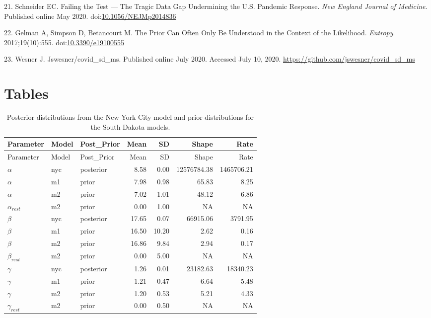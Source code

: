 \documentclass[
]{article}
\begin{document}
\leavevmode\hypertarget{ref-schneider_failing_2020}{}%
21. Schneider EC. Failing the Test --- The Tragic Data Gap Undermining the U.S. Pandemic Response. \emph{New England Journal of Medicine}. Published online May 2020. doi:\href{https://doi.org/10.1056/NEJMp2014836}{10.1056/NEJMp2014836}

\leavevmode\hypertarget{ref-gelman_prior_2017}{}%
22. Gelman A, Simpson D, Betancourt M. The Prior Can Often Only Be Understood in the Context of the Likelihood. \emph{Entropy}. 2017;19(10):555. doi:\href{https://doi.org/10.3390/e19100555}{10.3390/e19100555}

\leavevmode\hypertarget{ref-wesner_jswesnercovid_sd_ms_2020}{}%
23. Wesner J. Jswesner/covid\_sd\_ms. Published online July 2020. Accessed July 10, 2020. \url{https://github.com/jswesner/covid_sd_ms}

\newpage

\FloatBarrier

\hypertarget{tables}{%
\section{Tables}\label{tables}}

\begin{longtable}[]{@{}lllrrrr@{}}
\caption{\label{tab:unnamed-chunk-1}Posterior distributions from the New York City model and prior distributions for the South Dakota models.}\tabularnewline
\toprule
Parameter & Model & Post\_Prior & Mean & SD & Shape & Rate\tabularnewline
\midrule
\endfirsthead
\toprule
Parameter & Model & Post\_Prior & Mean & SD & Shape & Rate\tabularnewline
\midrule
\endhead
\(\alpha\) & nyc & posterior & 8.58 & 0.00 & 12576784.38 & 1465706.21\tabularnewline
\(\alpha\) & m1 & prior & 7.98 & 0.98 & 65.83 & 8.25\tabularnewline
\(\alpha\) & m2 & prior & 7.02 & 1.01 & 48.12 & 6.86\tabularnewline
\(\alpha_{rest}\) & m2 & prior & 0.00 & 1.00 & NA & NA\tabularnewline
\(\beta\) & nyc & posterior & 17.65 & 0.07 & 66915.06 & 3791.95\tabularnewline
\(\beta\) & m1 & prior & 16.50 & 10.20 & 2.62 & 0.16\tabularnewline
\(\beta\) & m2 & prior & 16.86 & 9.84 & 2.94 & 0.17\tabularnewline
\(\beta_{rest}\) & m2 & prior & 0.00 & 5.00 & NA & NA\tabularnewline
\(\gamma\) & nyc & posterior & 1.26 & 0.01 & 23182.63 & 18340.23\tabularnewline
\(\gamma\) & m1 & prior & 1.21 & 0.47 & 6.64 & 5.48\tabularnewline
\(\gamma\) & m2 & prior & 1.20 & 0.53 & 5.21 & 4.33\tabularnewline
\(\gamma_{rest}\) & m2 & prior & 0.00 & 0.50 & NA & NA\tabularnewline
\bottomrule
\end{longtable}
\end{document}
